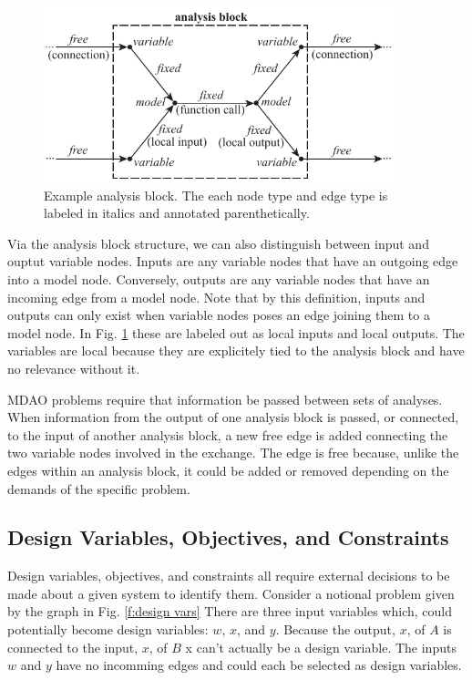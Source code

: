\begin{figure}[htb!]
    \begin{center}
    \includegraphics[width=4in]{images/analysis_block}
    \end{center}
    \vspace{-10pt}
\caption{Example analysis block. The each node type and edge type is labeled in italics and annotated parenthetically.}
\label{f:analysis block}
\end{figure}

Via the analysis block structure, we can also distinguish between input and ouptut
variable nodes. Inputs are any variable nodes that have an outgoing edge into a model 
node. Conversely, outputs are any variable nodes that have an incoming edge from a model node. 
Note that by this definition, inputs and outputs can only exist when variable nodes poses an 
edge joining them to a model node. In Fig. \ref{f:analysis block} these are labeled out as 
local inputs and local outputs. The variables are local because they are explicitely tied
to the analysis block and have no relevance without it. 

MDAO problems require that information be passed between sets of analyses. When information from the output of one analysis 
block is passed, or connected, to the input of another analysis block, a new free edge is added 
connecting the two variable nodes involved in the exchange. The edge is free because, unlike the edges 
within an analysis block, it could be added or removed depending on the demands of the specific problem. 

\subsection{Design Variables, Objectives, and Constraints}

Design variables, objectives, and constraints all require external decisions 
to be made about a given system to identify them. Consider 
a notional problem given by the graph in Fig. \ref{f:design vars} There are three input variables 
which, could potentially become design variables: $w$, $x$, and $y$. Because the output, $x$, of $A$
is connected to the input, $x$, of $B$ x can't actually be a design variable. The inputs $w$ and $y$
have no incomming edges and could each be selected as design variables. 

